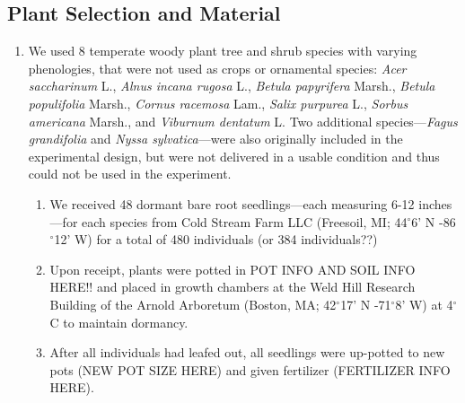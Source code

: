 \documentclass{article}\usepackage[]{graphicx}\usepackage[]{color}
\begin{document}
\subsection*{Plant Selection and Material}
\begin{enumerate}
\item We used 8 temperate woody plant tree and shrub species with varying phenologies, that were not used as crops or ornamental species: \textit{Acer saccharinum} L., \textit{Alnus incana rugosa} L., \textit{Betula papyrifera} Marsh., \textit{Betula populifolia} Marsh., \textit{Cornus racemosa} Lam., \textit{Salix purpurea} L., \textit{Sorbus americana} Marsh., and \textit{Viburnum dentatum} L. Two additional species---\textit{Fagus grandifolia} and \textit{Nyssa sylvatica}---were also originally included in the experimental design, but were not delivered in a usable condition and thus could not be used in the experiment.
  \begin{enumerate}
  \item We received 48 dormant bare root seedlings---each measuring 6-12 inches---for each species from Cold Stream Farm LLC (Freesoil, MI; 44$^{\circ}$6' N -86$^{\circ}$12' W) for a total of 480 individuals (or 384 individuals??)
  \item Upon receipt, plants were potted in POT INFO AND SOIL INFO HERE!! and placed in growth chambers at the Weld Hill Research Building of the Arnold Arboretum (Boston, MA; 42$^{\circ}$17' N -71$^{\circ}$8' W) at 4$^{\circ}$C to maintain dormancy.
  \item After all individuals had leafed out, all seedlings were up-potted to new pots (NEW POT SIZE HERE) and given fertilizer (FERTILIZER INFO HERE).
  \end{enumerate}
\end{enumerate}
\end{document}
